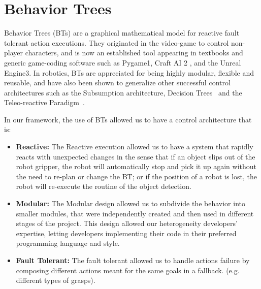 \section{Behavior Trees}
\label{sec:trees}


Behavior Trees (BTs) are a graphical mathematical model for reactive fault tolerant action executions. They originated in the video-game to control non-player characters, and is now an established tool appearing in textbooks \cite{millington2009artificial,rabin2014gameAiPro} and generic game-coding software such as Pygame1, Craft AI 2 , and the Unreal Engine3. In robotics, BTs are appreciated for being highly modular, flexible and reusable, and have also been shown to generalize other successful control architectures such as the Subsumption architecture, Decision Trees~\cite{tro16colledanchise} and the Teleo-reactive Paradigm~\cite{Colledanchise16iros}.

In our framework, the use of BTs allowed us to have a control architecture that is:

\begin{itemize}
\item \textbf{Reactive:} The Reactive execution allowed us to have a system that rapidly reacts with unexpected changes in the sense that if an object slips out of the robot gripper, the robot will automatically stop and pick it up again without the need to re-plan or change the BT; or if the position of a robot is lost, the robot will re-execute the routine of the object detection.
\item \textbf{Modular:} The Modular design allowed us to subdivide the behavior into smaller modules, that were independently created and then used in different stages of the project. This design allowed our heterogeneity developers’ expertise, letting developers implementing their code in their preferred programming language and style.
\item \textbf{Fault Tolerant:} The fault tolerant allowed us to handle actions failure by composing different actions meant for the same goals in a fallback. (e.g. different types of grasps).
\end{itemize}



